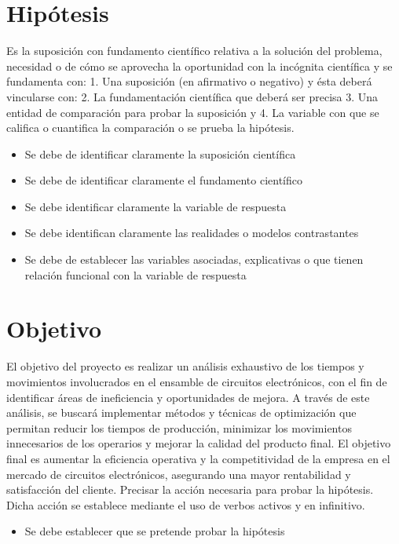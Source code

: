     \section{Hipótesis}
    
    Es la suposición con fundamento científico relativa a la solución del problema, necesidad o de cómo se aprovecha la oportunidad con la incógnita científica y se fundamenta con: 1. Una suposición (en afirmativo o negativo) y ésta deberá vincularse con:
    2. La fundamentación científica que deberá ser precisa 3. Una entidad de comparación para probar la suposición y
    4. La variable con que se califica o cuantifica la comparación o se prueba la hipótesis.
    
    \begin{itemize}
        \item Se debe de identificar claramente la suposición científica
        \item Se debe de identificar claramente el fundamento científico
        \item Se debe identificar claramente la variable de respuesta
        \item Se debe identifican claramente las realidades o modelos contrastantes
        \item Se debe de establecer las variables asociadas, explicativas o que tienen relación funcional con la variable de respuesta
    \end{itemize}
    \section{Objetivo}
    El objetivo del proyecto es realizar un análisis exhaustivo de los tiempos y movimientos involucrados en el ensamble de circuitos electrónicos, con el fin de identificar áreas de ineficiencia y oportunidades de mejora. A través de este análisis, se buscará implementar métodos y técnicas de optimización que permitan reducir los tiempos de producción, minimizar los movimientos innecesarios de los operarios y mejorar la calidad del producto final. El objetivo final es aumentar la eficiencia operativa y la competitividad de la empresa en el mercado de circuitos electrónicos, asegurando una mayor rentabilidad y satisfacción del cliente.
    Precisar la acción necesaria para probar la hipótesis. Dicha acción se establece mediante el uso de verbos activos y en infinitivo.
    \begin{itemize}
        \item Se debe establecer que se pretende probar la hipótesis
    \end{itemize}
    
